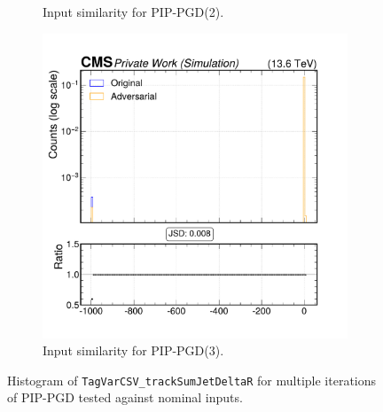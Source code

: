 \begin{figure}[h]
\begin{subfigure}[t]{0.32\textwidth}
    \caption*{Input similarity for PIP-PGD(2).}
  \end{subfigure}\hfill
  \begin{subfigure}[t]{0.32\textwidth}
    \includegraphics[width=\linewidth]{media/output/features/compare/combined_it_3/cmp_global_features_TagVarCSV_trackSumJetDeltaR.pdf}
    \caption*{Input similarity for PIP-PGD(3).}
  \end{subfigure}

  \caption*{Histogram of \texttt{TagVarCSV\_trackSumJetDeltaR} for multiple iterations of PIP-PGD tested against nominal inputs.}
  \label{fig:combined_input_TagVarCSV_trackSumJetDeltaR}
\end{figure}

